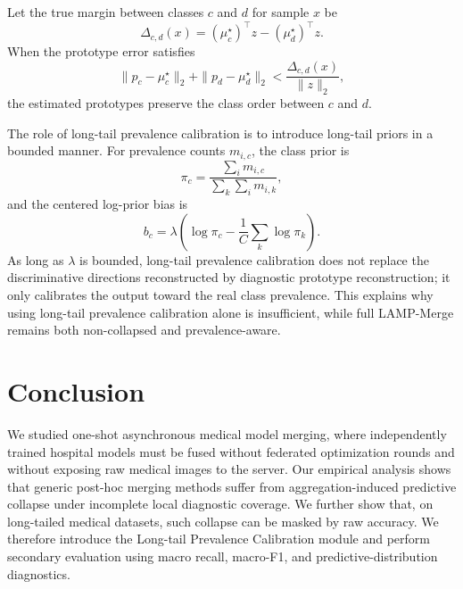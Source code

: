 \documentclass[letterpaper]{article} %
\begin{document}
Let the true margin between classes $c$ and $d$ for sample $x$ be
\begin{equation}
\Delta_{c,d}(x)=(\mu_c^\star)^\top z-(\mu_d^\star)^\top z.
\end{equation}
When the prototype error satisfies
\begin{equation}
\|p_c-\mu_c^\star\|_2+\|p_d-\mu_d^\star\|_2
<
\frac{\Delta_{c,d}(x)}{\|z\|_2},
\end{equation}
the estimated prototypes preserve the class order between $c$ and $d$.

The role of long-tail prevalence calibration is to introduce long-tail priors in a bounded manner. For prevalence counts $m_{i,c}$, the class prior is
\begin{equation}
\pi_c=\frac{\sum_i m_{i,c}}{\sum_k \sum_i m_{i,k}},
\end{equation}
and the centered log-prior bias is
\begin{equation}
b_c=\lambda\left(\log\pi_c-\frac{1}{C}\sum_k\log\pi_k\right).
\end{equation}
As long as $\lambda$ is bounded, long-tail prevalence calibration does not replace the discriminative directions reconstructed by diagnostic prototype reconstruction; it only calibrates the output toward the real class prevalence. This explains why using long-tail prevalence calibration alone is insufficient, while full LAMP-Merge remains both non-collapsed and prevalence-aware.

\section{Conclusion}

We studied one-shot asynchronous medical model merging, where independently trained hospital models must be fused without federated optimization rounds and without exposing raw medical images to the server. Our empirical analysis shows that generic post-hoc merging methods suffer from aggregation-induced predictive collapse under incomplete local diagnostic coverage. We further show that, on long-tailed medical datasets, such collapse can be masked by raw accuracy. We therefore introduce the Long-tail Prevalence Calibration module and perform secondary evaluation using macro recall, macro-F1, and predictive-distribution diagnostics\cite{BUDA2018249,5597285}.
\end{document}
